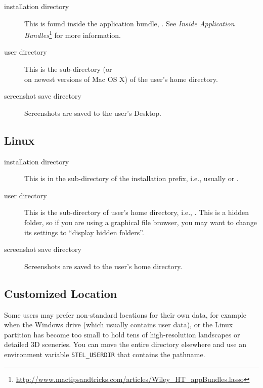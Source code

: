 \begin{description}
\item[installation directory] This is found inside the application
  bundle, . See \emph{Inside Application
    Bundles}\footnote{\url{http://www.mactipsandtricks.com/articles/Wiley_HT_appBundles.lasso}}
  for more information.
\item[user directory] This is the sub-directory 
   (or \\
   on
  newest versions of Mac OS X) of the user's home
  directory.
\item[screenshot save directory] Screenshots are saved to the user's
  Desktop.
\end{description}

\subsection{Linux}
\label{sec:FilesAndDirectories:Linux}

\begin{description}
\item[installation directory] This is in the
   sub-directory of the installation prefix,
  i.e., usually  or
  .
\item[user directory] This is the  sub-directory of
  user's home directory, i.e.,
  . This is a hidden folder, so
  if you are using a graphical file browser, you may want to change
  its settings to ``display hidden folders''.
\item[screenshot save directory] Screenshots are saved to the user's
  home directory.
\end{description}

\subsection{Customized Location}
\label{sec:FilesAndDirectories:Custom}

Some users may prefer non-standard locations for
their own data, for example when the Windows  drive (which
usually contains user data), or the Linux  partition has
become too small to hold tens of high-resolution landscapes or
detailed 3D sceneries. You can move the entire directory elsewhere and
use an environment variable \texttt{STEL\_USERDIR} that contains the
pathname.

